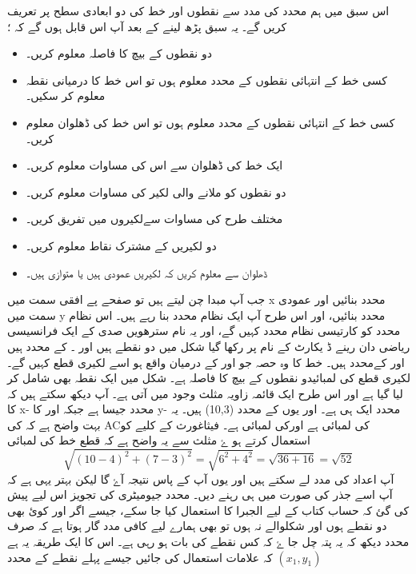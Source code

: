  اس سبق میں ہم محدد کی مدد سے نقطوں اور خط کی   دو ابعادی سطح پر  تعریف کریں گے۔ یہ سبق پڑھ لینے کے بعد آپ اس قابل ہوں گے کہ ؛
\begin{itemize}
\item   
دو نقطوں کے بیچ کا فاصلہ معلوم کریں۔
\item
کسی خط کے انتہائی نقطوں کے محدد معلوم ہوں تو اس خط کا درمیانی نقطہ معلوم کر سکیں۔
\item
کسی خط کے انتہائی نقطوں کے محدد معلوم ہوں تو اس خط کی ڈھلوان معلوم کریں۔
\item
ایک خط کی ڈھلوان سے اس کی مساوات معلوم کریں۔
\item
دو نقطوں کو ملانے والی لکیر کی مساوات معلوم کریں۔
\item
 مختلف طرح کی مساوات سےلکیروں میں تفریق کریں۔
\item
دو لکیریں کے مشترک نقاط  معلوم کریں۔
\item
ڈھلوان سے معلوم کریں کہ لکیریں عمودی ہیں یا متوازی ہیں۔ 
\end{itemize}
جب آپ مبدا چن لیتے ہیں تو صفحے پے افقی سمت میں x محدد بنائیں    اور عمودی سمت  میں y محدد بنائیں، اور اس طرح آپ ایک نظام محدد بنا رہے ہیں۔  اس نظام محدد کو کارتیسی نظام محدد کہیں گے، اور یہ نام سترھویں صدی کے  ایک فرانسیسی ریاضی دان     رینے             ڈ یکارٹ     کے نام پر رکھا گیا
 شکل    میں دو نقطے ہیں   اور ۔   کے محدد  ہیں اور   کےمحدد  ہیں۔  خط کا وہ حصہ جو     اور       کے درمیان واقع ہو اسے لکیری قطع کہیں گے۔ لکیری قطع کی لمبائیدو نقطوں کے بیچ کا فاصلہ ہے۔
شکل   میں ایک نقطہ      بھی شامل کر لیا گیا ہے اور اس طرح ایک قائمہ زاویہ مثلث وجود میں آتی ہے۔ آپ دیکھ سکتے ہیں کہ     کا  x- محدد     جیسا ہے جبکہ     اور      کا y- محدد ایک ہی ہے۔  اور یوں  کے   محدد  (10,3) ہیں۔
یہ بہت واضح ہے کہ   کی {AC}کی لمبائی      ہے اورکی لمبائی ہے۔ فیثاغورث کے کلیے کو استعمال کرتے ہو ۓ مثلث سے یہ واضح ہے کہ قطع خط کی لمبائی \[ \sqrt{(10-4)^2 + (7-3)^2} = \sqrt{6^2 + 4^2} = \sqrt{36+16} = \sqrt{52}
\] 
 آپ اعداد کی مدد لے سکتے ہیں اور یوں آپ کے پاس نتیجہ      آۓ گا لیکن بہتر یہی ہے کہ آپ اسے جذر کی صورت میں ہی رہنے دیں۔
 محدد جیومیٹری کی تجویز اس لیے پیش کی گئ کہ حساب کتاب کے لیے الجبرا کا استعمال کیا جا سکے، جیسے اگر       اور      کوئ بھی دو نقطے ہوں اور شکلوالے نہ ہوں تو بھی ہمارے لیے کافی مدد گار ہوتا ہے کہ صرف محدد دیکھ کہ یہ پتہ چل جا ۓ کہ کس نقطے کی بات ہو رہی ہے۔ اس کا ایک طریقہ یہ ہے کہ علامات استعمال کی جائیں جیسے پہلے نقطے کے محدد   \((x_{1},y_{1})\)
